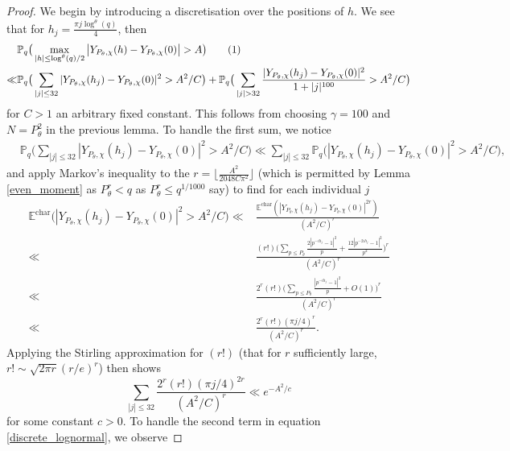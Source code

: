 \documentclass[10pt,a4paper]{amsart}
\numberwithin{equation}{section}
\newcommand\numberthis{\addtocounter{equation}{1}\tag{\theequation}}
\begin{document}
\begin{proof}
    We begin by introducing a discretisation over the positions of $h$. We see that for $h_j = \frac{\pi j \log^{\theta}(q)}{4}$, then
    \begin{align*}
        &\mathbb{P}_q\big(\max_{|h| \leq \log^{\theta}(q)/2}\big|Y_{P_\theta,\chi}(h)-Y_{P_\theta,\chi}(0) \big| > A\big) \numberthis \label{discrete_lognormal} \\
        \ll& \mathbb{P}_q\big(\sum_{|j| \leq 32}|Y_{P_\theta,\chi}(h_j)-Y_{P_\theta,\chi}(0)|^2 > A^2/C\big) + \mathbb{P}_q\big(\sum_{|j| > 32}\frac{|Y_{P_\theta,\chi}(h_j)-Y_{P_\theta,\chi}(0)|^2}{1+|j|^{100}} > A^2/C\big)
    \end{align*}
    for $C>1$ an arbitrary fixed constant. This follows from choosing $\gamma=100$ and $N=P_\theta^2$ in the previous lemma. To handle the first sum, we notice
    \begin{align*}
        &\mathbb{P}_q\big(\sum_{|j| \leq 32}|Y_{P_\theta,\chi}(h_j)-Y_{P_\theta,\chi}(0)|^2 > A^2/C\big) \ll \sum_{|j| \leq 32}\mathbb{P}_q\big(|Y_{P_\theta,\chi}(h_j)-Y_{P_\theta,\chi}(0)|^2 > A^2/C\big),
    \end{align*}
    and apply Markov's inequality to the $r=\lfloor \frac{A^2}{2048C\pi^2}\rfloor$ (which is permitted by Lemma \ref{even_moment} as $P_\theta^r < q$ as $P_\theta^r \leq q^{1/1000}$ say) to find for each individual $j$
    \begin{align*}
        \mathbb{E}^{\text{char}}\bigg(|Y_{P_\theta,\chi}(h_j)-Y_{P_\theta,\chi}(0)|^2 > A^2/C\bigg)
        \ll& \frac{\mathbb{E}^{\text{char}}(|Y_{P_\theta,\chi}(h_j)-Y_{P_\theta,\chi}(0)|^{2r})}{(A^2/C)^{r}} \\ \ll& \frac{(r!)\big(\sum_{p \leq P_\theta}\frac{2|p^{-ih_j}-1|^2}{p}+\frac{12|p^{-2ih_j}-1|^2}{p^2}\big)^r}{(A^2/C)^r} \\
        \ll& \frac{2^r(r!)\big(\sum_{p \leq P_\theta}\frac{|p^{-ih_j}-1|^2}{p}+O(1)\big)^r}{(A^2/C)^r} \\
        \ll& \frac{2^r(r!)(\pi j/4)^{r}}{(A^2/C)^{r}}.
    \end{align*}
    Applying the Stirling approximation for $(r!)$ (that for $r$ sufficiently large, $r! \sim \sqrt{2\pi r}(r/e)^r$) then shows
    \begin{equation}
        \sum_{|j| \leq 32}\frac{2^r(r!)(\pi j/4)^{2r}}{(A^2/C)^{r}} \ll e^{-A^2/c} \label{small_j}
    \end{equation}
    for some constant $c>0$. To handle the second term in equation \ref{discrete_lognormal}, we observe

\end{proof}
\end{document}
